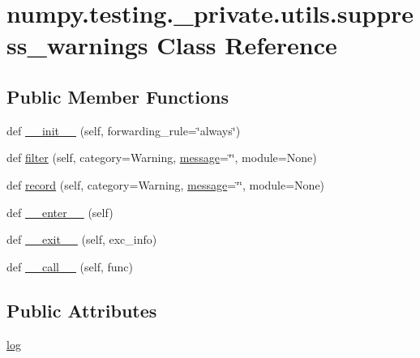 \hypertarget{classnumpy_1_1testing_1_1__private_1_1utils_1_1suppress__warnings}{}\section{numpy.\+testing.\+\_\+private.\+utils.\+suppress\+\_\+warnings Class Reference}
\label{classnumpy_1_1testing_1_1__private_1_1utils_1_1suppress__warnings}
\subsection*{Public Member Functions}
\begin{DoxyCompactItemize}
\item 
def \hyperlink{classnumpy_1_1testing_1_1__private_1_1utils_1_1suppress__warnings_a48996d020ba499a43550a87e9320fed2}{\+\_\+\+\_\+init\+\_\+\+\_\+} (self, forwarding\+\_\+rule=\char`\"{}always\char`\"{})
\item 
def \hyperlink{classnumpy_1_1testing_1_1__private_1_1utils_1_1suppress__warnings_ae76b46f993d43ef6004c188d1ca56df9}{filter} (self, category=Warning, \hyperlink{namespacenumpy_a2222f7c2b3c819deee274f05ccc2a705}{message}=\char`\"{}\char`\"{}, module=None)
\item 
def \hyperlink{classnumpy_1_1testing_1_1__private_1_1utils_1_1suppress__warnings_a6e409dc03b96a9a48ee0f6ae4f5dd56a}{record} (self, category=Warning, \hyperlink{namespacenumpy_a2222f7c2b3c819deee274f05ccc2a705}{message}=\char`\"{}\char`\"{}, module=None)
\item 
def \hyperlink{classnumpy_1_1testing_1_1__private_1_1utils_1_1suppress__warnings_abc9a2f9923fb0277fac9ed1dc36ac090}{\+\_\+\+\_\+enter\+\_\+\+\_\+} (self)
\item 
def \hyperlink{classnumpy_1_1testing_1_1__private_1_1utils_1_1suppress__warnings_aa43612a5edd70bab3de2667694062209}{\+\_\+\+\_\+exit\+\_\+\+\_\+} (self, exc\+\_\+info)
\item 
def \hyperlink{classnumpy_1_1testing_1_1__private_1_1utils_1_1suppress__warnings_a82f47e276944f492d41594e34eb03b21}{\+\_\+\+\_\+call\+\_\+\+\_\+} (self, func)
\end{DoxyCompactItemize}
\subsection*{Public Attributes}
\begin{DoxyCompactItemize}
\item 
\hyperlink{classnumpy_1_1testing_1_1__private_1_1utils_1_1suppress__warnings_a2c36222e96feb7fae6edbb1a090f597e}{log}
\end{DoxyCompactItemize}


